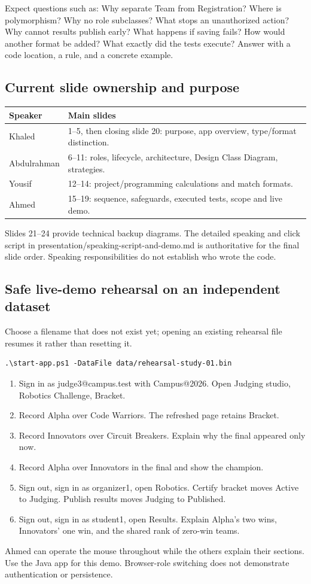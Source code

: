 \documentclass[12pt]{article}
\begin{document}
Expect questions such as: Why separate Team from Registration? Where is polymorphism? Why no role subclasses? What stops an unauthorized action? Why cannot results publish early? What happens if saving fails? How would another format be added? What exactly did the tests execute? Answer with a code location, a rule, and a concrete example.

\subsection{Current slide ownership and purpose}
\begin{tabularx}{\linewidth}{lY}\toprule Speaker & Main slides\\\midrule
Khaled & 1--5, then closing slide 20: purpose, app overview, type/format distinction.\\
Abdulrahman & 6--11: roles, lifecycle, architecture, Design Class Diagram, strategies.\\
Yousif & 12--14: project/programming calculations and match formats.\\
Ahmed & 15--19: sequence, safeguards, executed tests, scope and live demo.\\\bottomrule\end{tabularx}
Slides 21--24 provide technical backup diagrams. The detailed speaking and click script in presentation/speaking-script-and-demo.md is authoritative for the final slide order. Speaking responsibilities do not establish who wrote the code.

\subsection{Safe live-demo rehearsal on an independent dataset}
Choose a filename that does not exist yet; opening an existing rehearsal file resumes it rather than resetting it.
\begin{verbatim}
.\start-app.ps1 -DataFile data/rehearsal-study-01.bin
\end{verbatim}
\begin{enumerate}
\item Sign in as judge3@campus.test with Campus@2026. Open Judging studio, Robotics Challenge, Bracket.
\item Record Alpha over Code Warriors. The refreshed page retains Bracket.
\item Record Innovators over Circuit Breakers. Explain why the final appeared only now.
\item Record Alpha over Innovators in the final and show the champion.
\item Sign out, sign in as organizer1, open Robotics. Certify bracket moves Active to Judging. Publish results moves Judging to Published.
\item Sign out, sign in as student1, open Results. Explain Alpha's two wins, Innovators' one win, and the shared rank of zero-win teams.
\end{enumerate}
Ahmed can operate the mouse throughout while the others explain their sections. Use the Java app for this demo. Browser-role switching does not demonstrate authentication or persistence.
\end{document}

